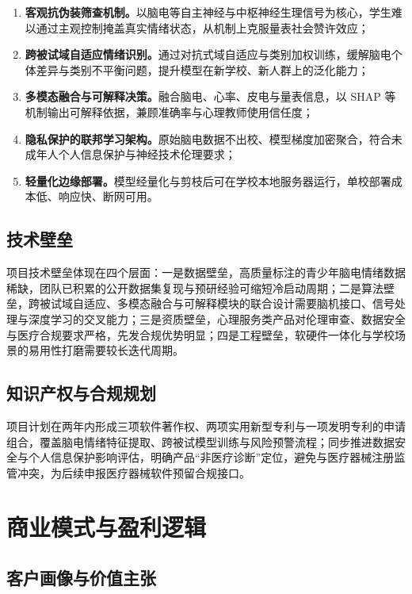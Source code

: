 \documentclass[zihao=-4,fontset=windows,a4paper]{ctexart}
\begin{document}
\begin{enumerate}
  \item \textbf{客观抗伪装筛查机制。}以脑电等自主神经与中枢神经生理信号为核心，学生难以通过主观控制掩盖真实情绪状态，从机制上克服量表社会赞许效应；
  \item \textbf{跨被试域自适应情绪识别。}通过对抗式域自适应与类别加权训练，缓解脑电个体差异与类别不平衡问题，提升模型在新学校、新人群上的泛化能力；
  \item \textbf{多模态融合与可解释决策。}融合脑电、心率、皮电与量表信息，以 SHAP 等机制输出可解释依据，兼顾准确率与心理教师使用信任度；
  \item \textbf{隐私保护的联邦学习架构。}原始脑电数据不出校、模型梯度加密聚合，符合未成年人个人信息保护与神经技术伦理要求；
  \item \textbf{轻量化边缘部署。}模型经量化与剪枝后可在学校本地服务器运行，单校部署成本低、响应快、断网可用。
\end{enumerate}

\subsection{技术壁垒}

项目技术壁垒体现在四个层面：一是数据壁垒，高质量标注的青少年脑电情绪数据稀缺，团队已积累的公开数据集复现与预研经验可缩短冷启动周期；二是算法壁垒，跨被试域自适应、多模态融合与可解释模块的联合设计需要脑机接口、信号处理与深度学习的交叉能力；三是资质壁垒，心理服务类产品对伦理审查、数据安全与医疗合规要求严格，先发合规优势明显；四是工程壁垒，软硬件一体化与学校场景的易用性打磨需要较长迭代周期。

\subsection{知识产权与合规规划}

项目计划在两年内形成三项软件著作权、两项实用新型专利与一项发明专利的申请组合，覆盖脑电情绪特征提取、跨被试模型训练与风险预警流程；同步推进数据安全与个人信息保护影响评估，明确产品“非医疗诊断”定位，避免与医疗器械注册监管冲突，为后续申报医疗器械软件预留合规接口。

\section{商业模式与盈利逻辑}

\subsection{客户画像与价值主张}
\end{document}
